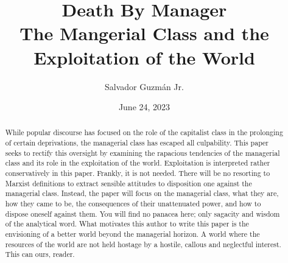 \documentclass[12pt]{article}
\title{
 Death By Manager \\
 \large The Mangerial Class and the Exploitation of the World}
\author{Salvador Guzm\'an Jr.}
\date{June 24, 2023}
\begin{document}
\maketitle
\pagebreak

\begin{abstract}
    While popular discourse has focused on the role of the capitalist class in the prolonging of certain deprivations, the managerial class has escaped all culpability.
    This paper seeks to rectify this oversight by examining the rapacious tendencies of the managerial class and its role in the exploitation of the world.
    Exploitation is interpreted rather conservatively in this paper.
    Frankly, it is not needed.
    There will be no resorting to Marxist definitions to extract sensible attitudes to disposition one against the managerial class. Instead, the paper will focus on the managerial class, what they are, how they came to be, the consequences of their unattenuated power, and how to dispose oneself against them.
    You will find no panacea here; only sagacity and wisdom of the analytical word. What motivates this author to write this paper is the envisioning of a better world beyond the managerial horizon.
    A world where the resources of the world are not held hostage by a hostile, callous and neglectful interest.
    This can ours, reader.
\end{abstract}
\pagebreak
\tableofcontents
\pagebreak
\end{document}
